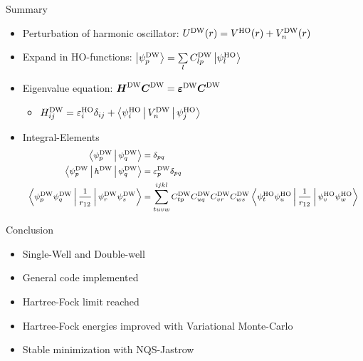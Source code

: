 \documentclass[10pt, t]{beamer}
\begin{document}
\begin{frame}[fragile]{Summary}
    \begin{itemize}
        \item Perturbation of harmonic oscillator: $\UDW(r) = \VHO(r) + \VDW_n(r)$
        \item Expand in HO-functions: $\ket{\psiDW_p} = \sumll{l}C^{\text{DW}}_{lp}\ket{\psiHO_l}$
        \item Eigenvalue equation: $\blds{H}^{\text{DW}}\blds{C}^{\text{DW}} =
            \blds{\varepsilon^{\text{DW}}}\blds{C}^{\text{DW}}$
            \begin{itemize}
                \item $H^{\text{DW}}_{ij} = \veps^{\text{HO}}_i\delta_{ij} +
                    \Braket{\psiHO_i|\VDW_n|\psiHO_j}$
            \end{itemize}
        \item Integral-Elements
        \begin{equation*}
            \footnotesize
            \begin{aligned}
                \Braket{\psiDW_p|\psiDW_q} &= \delta_{pq} \\
                \Braket{\psiDW_p|h^{\text{DW}}|\psiDW_q} &=
                \varepsilon^{\text{DW}}_p\delta_{pq} \\
                \Braket{\psiDW_p\psiDW_q|\frac{1}{r_{12}}|\psiDW_r\psiDW_s} &=
                \suml{tuvw}{ijkl} C^{\text{DW}}_{tp}C^{\text{DW}}_{uq}C^{\text{DW}}_{vr}C^{\text{DW}}_{ws}
                \Braket{\psiHO_t\psiHO_u|\frac{1}{r_{12}}|\psiHO_v\psiHO_w}
            \end{aligned}
        \end{equation*}
    \end{itemize}
\end{frame}

\begin{frame}[fragile]{Conclusion}
    \begin{itemize}[<+->]
        \item Single-Well and Double-well
        \item General \CC code implemented
        \item Hartree-Fock limit reached
        \item Hartree-Fock energies improved with Variational Monte-Carlo
        \item Stable minimization with NQS-Jastrow
    \end{itemize}
\end{frame}
\end{document}

